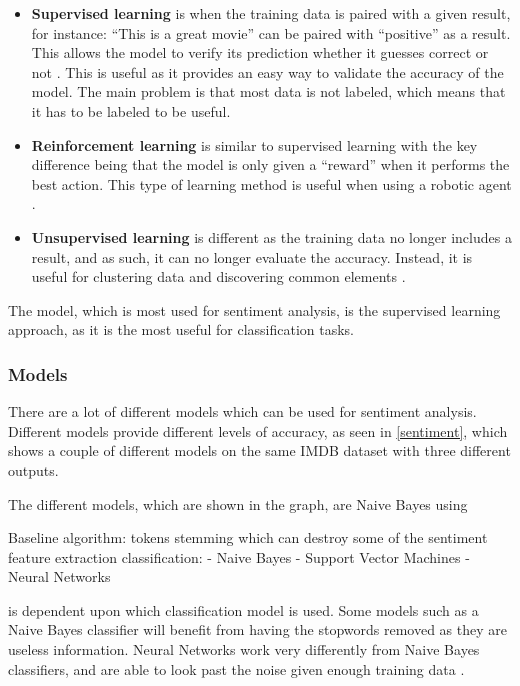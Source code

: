 \begin{itemize}
  \item \textbf{Supervised learning} is when the training data is paired with a
  given result, for instance: ``This is a great movie'' can be paired with
  ``positive'' as a result. This allows the model to verify its prediction
  whether it guesses correct or not \citep[Ch. 7.0]{MIBook}\KT. This is useful
  as it provides an easy way to validate the accuracy of the model. The main problem
  is that most data is not labeled, which means that it has to be labeled to be
  useful.
  \item \textbf{Reinforcement learning} is similar to supervised learning with
  the key difference being that the model is only given a ``reward'' when it
  performs the best action. This type of learning method is useful when
  using a robotic agent \citep{Reinforcement}.
  \item \textbf{Unsupervised learning} is different as the training data no
  longer includes a result, and as such, it can no longer evaluate the accuracy.
  Instead, it is useful for clustering data and discovering common elements
  \citep[Ch. 11.1]{MIBook}\KT.
\end{itemize}

The model, which is most used for sentiment analysis, is the supervised learning
approach, as it is the most useful for classification tasks.

\subsubsection{Models}\label{subsub:Models}

There are a lot of different models which can be used for sentiment analysis. 
Different models provide different levels of accuracy, as seen in
\autoref{sentiment}, which shows a couple of different models on the same IMDB
dataset with three different outputs\citep{Classification}.


The different models, which are shown in the graph, are Naive Bayes using 

Baseline algorithm:
tokens
stemming which can destroy some of the sentiment
feature extraction
classification:
- Naive Bayes
- Support Vector Machines
- Neural Networks



 is dependent upon which classification model is used. Some models
such as a Naive Bayes classifier will benefit from having the stopwords removed
as they are useless information. Neural Networks work very differently from
Naive Bayes classifiers, and are able to look past the noise given enough
training data \Source.\nl